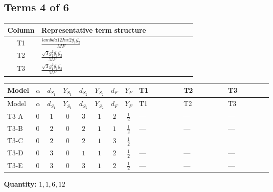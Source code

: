 \documentclass[8pt]{article}
\begin{document}
\begin{landscape}
\subsection*{Terms 4 of 6}
\begin{center}
\begin{tabular}{@{}c >{\raggedright\arraybackslash}p{0.82\linewidth}@{}}
\toprule
Column & Representative term structure \\
\midrule
T1 & \(\displaystyle \frac{lambda12Inv2 \overline{y_{1}} \overline{y_{2}}}{MF}\) \\
\midrule
T2 & \(\displaystyle \frac{\sqrt{3} g_{2}^{2} \overline{y_{1}} \overline{y_{2}}}{MF}\) \\
\midrule
T3 & \(\displaystyle \frac{\sqrt{3} g_{1}^{2} \overline{y_{1}} \overline{y_{2}}}{MF}\) \\
\midrule
\bottomrule
\end{tabular}
\end{center}
\smallskip
\tiny
\begin{longtable}{@{}llcccccc >{\raggedright\arraybackslash}p{0.21\linewidth} >{\raggedright\arraybackslash}p{0.21\linewidth} >{\raggedright\arraybackslash}p{0.21\linewidth}@{}}
\toprule
Model & $\alpha$ & $d_{S_1}$ & $Y_{S_1}$ & $d_{S_2}$ & $Y_{S_2}$ & $d_F$ & $Y_F$ & T1 & T2 & T3 \\
\midrule
\endfirsthead
\toprule
Model & $\alpha$ & $d_{S_1}$ & $Y_{S_1}$ & $d_{S_2}$ & $Y_{S_2}$ & $d_F$ & $Y_F$ & T1 & T2 & T3 \\
\midrule
\endhead
T3-A & $0$ & $1$ & $0$ & $3$ & $1$ & $2$ & $\frac{1}{2}$ & --- & --- & --- \\
\midrule
T3-B & $0$ & $2$ & $0$ & $2$ & $1$ & $1$ & $\frac{1}{2}$ & --- & --- & --- \\
\midrule
T3-C & $0$ & $2$ & $0$ & $2$ & $1$ & $3$ & $\frac{1}{2}$ & \scriptsize\adjustbox{max width=\linewidth}{$\begin{gathered} \frac{lambda12Inv2 \overline{y_{1}} \overline{y_{2}}}{3 MF}\end{gathered}$} & \scriptsize\adjustbox{max width=\linewidth}{$\begin{gathered} \frac{\sqrt{3} g_{2}^{2} \overline{y_{1}} \overline{y_{2}}}{4 MF}\end{gathered}$} & \scriptsize\adjustbox{max width=\linewidth}{$\begin{gathered} \frac{\sqrt{3} g_{1}^{2} \overline{y_{1}} \overline{y_{2}}}{8 MF}\end{gathered}$} \\
\midrule
T3-D & $0$ & $3$ & $0$ & $1$ & $1$ & $2$ & $\frac{1}{2}$ & --- & --- & --- \\
\midrule
T3-E & $0$ & $3$ & $0$ & $3$ & $1$ & $2$ & $\frac{1}{2}$ & --- & --- & --- \\
\midrule
\bottomrule
\end{longtable}
\clearpage
\noindent\textbf{Quantity: }$\mathrm{1,1,6,12}$\par\smallskip

\end{landscape}
\end{document}
